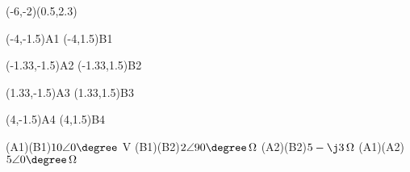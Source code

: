 \pspicture*(-6,-2)(0.5,2.3)


\pnode(-4,-1.5){A1}
\pnode(-4,1.5){B1}

\pnode(-1.33,-1.5){A2}
\pnode(-1.33,1.5){B2}

\pnode(1.33,-1.5){A3}
\pnode(1.33,1.5){B3}

\pnode(4,-1.5){A4}
\pnode(4,1.5){B4}

\Ucc[labelInside=2,labeloffset=13mm](A1)(B1){$10\angle 0\degree$ V}
\resistor[labeloffset=-5mm](B1)(B2){$2\angle90\degree\,\Omega$}
\resistor[labeloffset=-10mm](A2)(B2){$5-\j3\,\Omega$}
\resistor[labeloffset=5mm](A1)(A2){$5\angle 0\degree\,\Omega$}

\endpspicture